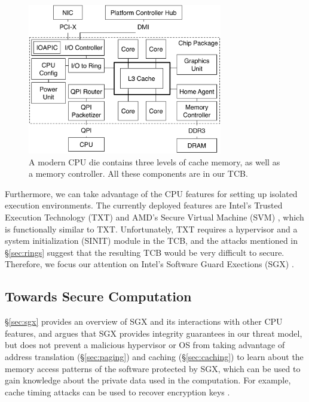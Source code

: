 \begin{figure}[hbtp]
  \centering
  \includegraphics[width=85mm]{figures/cpu_die.pdf}
  \caption{
    A modern CPU die contains three levels of cache memory, as well as a
    memory controller. All these components are in our TCB.
  }
  \label{fig:cpu_die}
\end{figure}

Furthermore, we can take advantage of the CPU features for setting up isolated
execution environments. The currently deployed features are Intel's Trusted
Execution Technology (TXT) \cite{grawrock2009txt} and AMD's Secure Virtual
Machine (SVM) \cite{strongin2005trusted}, which is functionally similar to TXT.
Unfortunately, TXT requires a hypervisor and a system initialization (SINIT)
module in the TCB, and the attacks mentioned in \S \ref{sec:rings} suggest that
the resulting TCB would be very difficult to secure. Therefore, we focus our
attention on Intel's Software Guard Exections (SGX) \cite{mckeen2013sgx}
\cite{anati2013sgx}.


\subsection{Towards Secure Computation}
\label{sec:approach}

\S \ref{sec:sgx} provides an overview of SGX and its interactions with other
CPU features, and argues that SGX provides integrity guarantees in our threat
model, but does not prevent a malicious hypervisor or OS from taking advantage
of address translation (\S \ref{sec:paging}) and caching (\S \ref{sec:caching})
to learn about the memory access patterns of the software protected by SGX,
which can be used to gain knowledge about the private data used in the
computation. For example, cache timing attacks can be used to recover
encryption keys \cite{bonneau2006cache} \cite{brumley2005remote}
\cite{kocher1996timing}.

